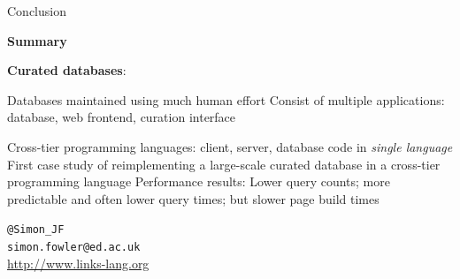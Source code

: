 \documentclass[11.5pt, aspectratio=169]{beamer}
\begin{document}
\begin{frame}[fragile]{Conclusion}

  \begin{fullpageitemize}
  \item {\LARGE \textbf{Summary}}
    \begin{itemize}
      \itemR \textbf{Curated databases}:
        \begin{itemize}
          \itemR Databases maintained using much human effort
          \itemR Consist of multiple applications: database, web
            frontend, curation interface
        \end{itemize}
%
      \itemR Cross-tier programming languages: client, server, database
        code in \emph{single language}
      \itemR First case study of reimplementing a large-scale curated database
        in a cross-tier programming language
      \itemR Performance results: Lower query counts; more predictable and often
        lower query times; but slower page build times
    \end{itemize}
  \end{fullpageitemize}

  {\large
  \begin{center}
    \verb+@Simon_JF+\\
    \verb+simon.fowler@ed.ac.uk+\\
    \url{http://www.links-lang.org}
  \end{center}
}
\end{frame}
\end{document}
